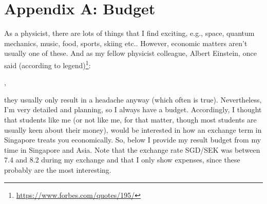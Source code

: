 \appendix
{}
\chapter*{Appendix A: Budget}
\vspace{-0.1cm}
As a physicist, there are lots of things that I find exciting, e.g., space, quantum mechanics, music, food, sports, skiing etc.. However, economic matters aren't usually one of these. And as my fellow physicist colleague, Albert Einstein, once said (according to legend)\footnote{\href{https://www.forbes.com/quotes/195/}{https://www.forbes.com/quotes/195/}}:

,

they usually only result in a headache anyway (which often is true). Nevertheless, I'm very detailed and planning, so I always have a budget. Accordingly, I thought that students like me (or not like me, for that matter, though most students are usually keen about their money), would be interested in how an exchange term in Singapore treats you economically. So, below I provide my result budget from my time in Singapore and Asia. Note that the exchange rate SGD/SEK was between 7.4 and 8.2 during my exchange and that I only show expenses, since these probably are the most interesting.


